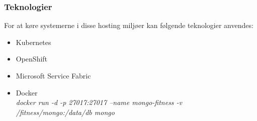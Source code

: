 \subsubsection{Teknologier}
For at køre systemerne i disse hosting miljøer kan følgende teknologier anvendes:

\begin{itemize}
	\item Kubernetes
	\item OpenShift
	\item Microsoft Service Fabric
	\item Docker\\
	\textit{docker run -d -p 27017:27017 --name mongo-fitness -v /fitness/mongo:/data/db mongo}
\end{itemize}
